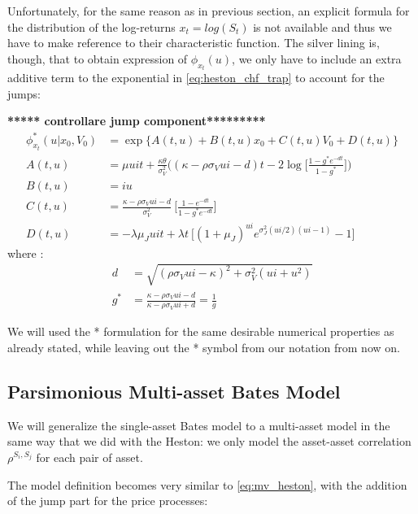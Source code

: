 Unfortunately, for the same reason as in previous section, an explicit formula for the distribution of the log-returns $x_t = log(S_t)$ is not available and thus we have to make reference to their characteristic function.
The silver lining is, though, that to obtain expression of   $\phi_{x_t}(u)$, we only have to include an extra additive term to the exponential in \eqref{eq:heston_chf_trap} to account for the jumps:

\textbf{***** controllare jump component*********}
\begin{equation}
\begin{split}
\label{eq:heston_chf_trap}
\phi_{x_t}^*(u| x_0, V_0) &= \exp\{A(t,u) + B(t,u) x_0 + C(t,u) V_0 + D(t,u)\}\\
A(t,u) &= \mu u i t +  \frac{\kappa\theta}{\sigma_V^2} \bigg( (\kappa - \rho\sigma_V u i - d)t - 2 \log\Big[  \frac{1-g^*e^{-dt}}{1-g^*} \Big] \bigg)\\
B(t,u) &= i u \\
C(t,u)&= \frac{\kappa - \rho\sigma_V u i - d}{\sigma_V^2} \:\Big[\frac{1-e^{-dt}}{1-g^*e^{-dt}}\Big]\\
D(t,u) &= -\lambda \mu_J u i t + \lambda t  \:\Big[ (1+\mu_J)^{ui} e^{\sigma_J^2(ui/2)(ui-1)}-1 \Big]
\end{split}
\end{equation} 
where :
\begin{equation*}
\begin{split}
d&=\sqrt{(\rho \sigma_V u i - \kappa)^2 + \sigma_V^2(u i + u^2)}\\
g^*&= \frac{\kappa - \rho\sigma_V u i - d}{\kappa - \rho\sigma_V u i + d} = \frac{1}{g}
\end{split}
\end{equation*} 

We will used the  *  formulation for the same desirable numerical properties as already stated, while leaving out the * symbol from our notation from now on.

\subsection{Parsimonious Multi-asset Bates Model}
We will generalize the single-asset Bates model to a multi-asset model in the same way that we did with the Heston: we only model the asset-asset correlation $\rho^{S_i, S_j}$ for each pair of asset.

The model definition becomes very similar to \eqref{eq:mv_heston}, with the addition of the jump part for the price processes:

